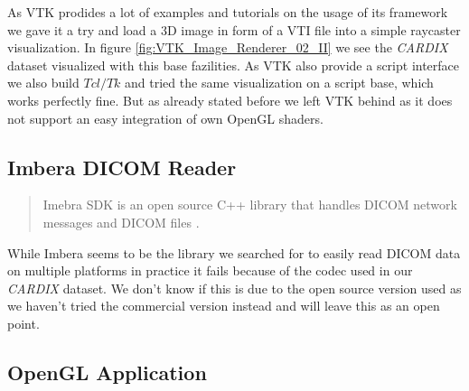 As VTK prodides a lot of examples and tutorials on the usage of its framework we gave it a try and load a 3D image in form of a VTI file into a simple raycaster visualization. In figure \ref{fig:VTK_Image_Renderer_02_II} we see the \emph{CARDIX} \cite{gimias_sampledata_2018} dataset visualized with this base fazilities. As VTK also provide a script interface we also build $Tcl/Tk$ and tried the same visualization on a script base, which works perfectly fine. But as already stated before we left VTK behind as it does not support an easy integration of own OpenGL shaders.





\subsection{Imbera DICOM Reader}


\blockquote{Imebra SDK is an open source C++ library that handles DICOM network messages and DICOM files \cite{imebra_dicom_sdk_2018}.}

While Imbera seems to be the library we searched for to easily read DICOM data on multiple platforms in practice it fails because of the codec used in our \emph{CARDIX} dataset. We don't know if this is due to the open source version used as we haven't tried the commercial version instead and will leave this as an open point.


\subsection{OpenGL Application}

